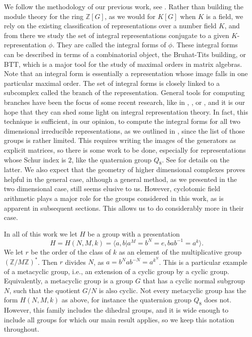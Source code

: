 \documentclass{article}
\theoremstyle{definition}
\begin{document}
We follow the methodology of our previous work, see \cite{AAS}. 
Rather than building the module theory for the ring $\mathbb{Z}[G]$,
as we would for $K[G]$ when $K$ is a field, we rely on the 
existing classification of representations over a number field $K$, 
and from there we study the set of  integral 
representations conjugate to a given $K$-representation $\phi$.
They are called the integral forms of $\phi$. These integral forms
can be described in terms of a combinatorial object, the Bruhat-Tits
building, or BTT, which is a major tool for the study of maximal orders in 
matrix algebras. Note that an integral form is essentially a representation 
whose image falls in one particular maximal order.
The set of integral forms is closely linked to a subcomplex
called the branch of the representation. General tools for computing
branches have been the focus of some recent research, like in 
\cite{A13}, \cite{A16}, \cite{AS16} or \cite{AB19},
and it is our hope that they can shed some 
light on integral representation theory. In fact, this technique is
sufficient, in our opinion, to compute the integral forms for all
two dimensional irreducible representations, as we outlined in
\cite{AAS}, since the list of those groups is rather limited. This requires
writing the images of the generators as explicit matrices, so there is some
work to be done, especially for representations whose Schur index is $2$,
like the quaternion group $Q_8$. See \cite{AB26} for details on the latter. 
We also expect that the geometry of higher dimensional complexes proves helpful
in the general case, although a general method, as we presented in
the two dimensional case, still seems elusive to us.
However, cyclotomic field 
arithmetic plays a major role for the groups considered in this work, 
as is apparent in subsequent sections. This allows us to do
considerably more in their case.

 In all of this work we let 
$H$ be a group with a presentation
\begin{equation}\label{fmg}
H=H(N,M,k)=\langle a,b|a^M=b^N=e, bab^{-1}=a^k\rangle.
\end{equation}
We let $r$ be the order of the class of $k$ as an element of
the multiplicative group $(\mathbb{Z}/M\mathbb{Z})^*$. Then $r$
divides $N$, as $a=b^Nab^{-N}=a^{k^N}$.
This is a particular example of a metacyclic group, i.e.,
an extension of a cyclic group by a cyclic group. 
Equivalently, a metacyclic group is a 
group $G$ that has a cyclic normal subgroup $N$, such that the 
quotient $G/N$ is also cyclic. Not every metacyclic 
group has the form $H(N,M,k)$ as above, for instance the 
quaternion group $Q_8$ does not. However, this family includes 
the dihedral groups, and it is wide enough to include all groups 
for which our main result applies, so we keep this notation throughout.
\end{document}
